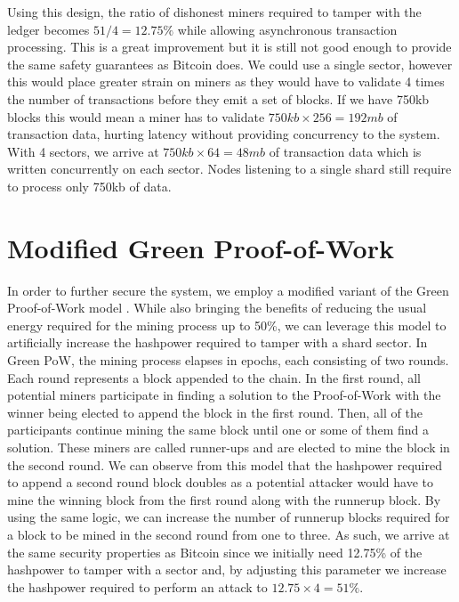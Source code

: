 \documentclass[notitlepage]{article}
\begin{document}
Using this design, the ratio of dishonest miners required to tamper with the ledger becomes $51/4 = 12.75\%$ while allowing asynchronous transaction processing. This is a great improvement but it is still not good enough to provide the same safety guarantees as Bitcoin does. We could use a single sector, however this would place greater strain on miners as they would have to validate 4 times the number of transactions before they emit a set of blocks. If we have 750kb blocks this would mean a miner has to validate $750kb \times 256 = 192mb$ of transaction data, hurting latency without providing concurrency to the system. With 4 sectors, we arrive at $750kb \times 64 = 48mb$ of transaction data which is written concurrently on each sector. Nodes listening to a single shard still require to process only 750kb of data. 

\section{Modified Green Proof-of-Work}
In order to further secure the system, we employ a modified variant of the Green Proof-of-Work model \cite{greenpow}. While also bringing the benefits of reducing the usual energy required for the mining process up to 50\%, we can leverage this model to artificially increase the hashpower required to tamper with a shard sector. In Green PoW, the mining process elapses in epochs, each consisting of two rounds. Each round represents a block appended to the chain. In the first round, all potential miners participate in finding a solution to the Proof-of-Work with the winner being elected to append the block in the first round. Then, all of the participants continue mining the same block until one or some of them find a solution. These miners are called runner-ups and are elected to mine the block in the second round. We can observe from this model that the hashpower required to append a second round block doubles as a potential attacker would have to mine the winning block from the first round along with the runnerup block. By using the same logic, we can increase the number of runnerup blocks required for a block to be mined in the second round from one to three. As such, we arrive at the same security properties as Bitcoin since we initially need 12.75\% of the hashpower to tamper with a sector and, by adjusting this parameter we increase the hashpower required to perform an attack to $12.75 \times 4 = 51\%$.

\clearpage
\end{document}
